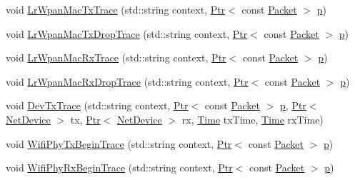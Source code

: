 \begin{DoxyCompactItemize}
\item 
void \hyperlink{classns3_1_1AnimationInterface_ad112dcaed89e607fae9a3ac83cf99f7c}{Lr\+Wpan\+Mac\+Tx\+Trace} (std\+::string context, \hyperlink{classns3_1_1Ptr}{Ptr}$<$ const \hyperlink{classns3_1_1Packet}{Packet} $>$ \hyperlink{lte__link__budget__x2__handover__measures_8m_ac9de518908a968428863f829398a4e62}{p})
\item 
void \hyperlink{classns3_1_1AnimationInterface_aaa51a08fdee148432a47a96ea72985ca}{Lr\+Wpan\+Mac\+Tx\+Drop\+Trace} (std\+::string context, \hyperlink{classns3_1_1Ptr}{Ptr}$<$ const \hyperlink{classns3_1_1Packet}{Packet} $>$ \hyperlink{lte__link__budget__x2__handover__measures_8m_ac9de518908a968428863f829398a4e62}{p})
\item 
void \hyperlink{classns3_1_1AnimationInterface_aaaa9c30fd38ae0b27ffcf06139e3cdb9}{Lr\+Wpan\+Mac\+Rx\+Trace} (std\+::string context, \hyperlink{classns3_1_1Ptr}{Ptr}$<$ const \hyperlink{classns3_1_1Packet}{Packet} $>$ \hyperlink{lte__link__budget__x2__handover__measures_8m_ac9de518908a968428863f829398a4e62}{p})
\item 
void \hyperlink{classns3_1_1AnimationInterface_a3dff4234758156eb305dec93b3f22a23}{Lr\+Wpan\+Mac\+Rx\+Drop\+Trace} (std\+::string context, \hyperlink{classns3_1_1Ptr}{Ptr}$<$ const \hyperlink{classns3_1_1Packet}{Packet} $>$ \hyperlink{lte__link__budget__x2__handover__measures_8m_ac9de518908a968428863f829398a4e62}{p})
\item 
void \hyperlink{classns3_1_1AnimationInterface_aefbe6c9288eaf784e7ba0cc875b5c319}{Dev\+Tx\+Trace} (std\+::string context, \hyperlink{classns3_1_1Ptr}{Ptr}$<$ const \hyperlink{classns3_1_1Packet}{Packet} $>$ \hyperlink{lte__link__budget__x2__handover__measures_8m_ac9de518908a968428863f829398a4e62}{p}, \hyperlink{classns3_1_1Ptr}{Ptr}$<$ \hyperlink{classns3_1_1NetDevice}{Net\+Device} $>$ tx, \hyperlink{classns3_1_1Ptr}{Ptr}$<$ \hyperlink{classns3_1_1NetDevice}{Net\+Device} $>$ rx, \hyperlink{classns3_1_1Time}{Time} tx\+Time, \hyperlink{classns3_1_1Time}{Time} rx\+Time)
\item 
void \hyperlink{classns3_1_1AnimationInterface_ad97b14e42c01f8fe9aa14fa31b8efbec}{Wifi\+Phy\+Tx\+Begin\+Trace} (std\+::string context, \hyperlink{classns3_1_1Ptr}{Ptr}$<$ const \hyperlink{classns3_1_1Packet}{Packet} $>$ \hyperlink{lte__link__budget__x2__handover__measures_8m_ac9de518908a968428863f829398a4e62}{p})
\item 
void \hyperlink{classns3_1_1AnimationInterface_ac0ad433cc67cc70e279b5ed8c006d762}{Wifi\+Phy\+Rx\+Begin\+Trace} (std\+::string context, \hyperlink{classns3_1_1Ptr}{Ptr}$<$ const \hyperlink{classns3_1_1Packet}{Packet} $>$ \hyperlink{lte__link__budget__x2__handover__measures_8m_ac9de518908a968428863f829398a4e62}{p})

\end{DoxyCompactItemize}
